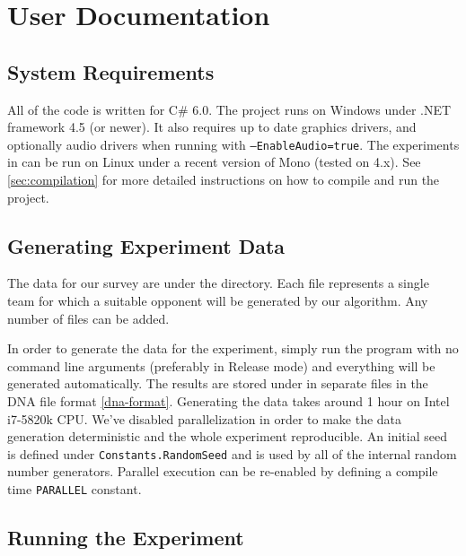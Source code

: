 \chapter{User Documentation}

\section{System Requirements}

All of the code is written for C\# 6.0. The  project runs on Windows under .NET framework 4.5 (or newer). It also requires up to date graphics drivers, and optionally audio drivers when running with \texttt{--EnableAudio=true}. The experiments in  can be run on Linux under a recent version of Mono (tested on 4.x). See \autoref{sec:compilation} for more detailed instructions on how to compile and run the project.

\section{Generating Experiment Data}

The data for our survey are under the  directory. Each file represents a single team for which a suitable opponent will be generated by our algorithm. Any number of files can be added.

In order to generate the data for the experiment, simply run the  program with no command line arguments (preferably in Release mode) and everything will be generated automatically. The results are stored under  in separate files in the DNA file format \autoref{dna-format}. Generating the data takes around 1 hour on Intel i7-5820k CPU. We've disabled parallelization in order to make the data generation deterministic and the whole experiment reproducible. An initial seed is defined under \verb|Constants.RandomSeed| and is used by all of the internal random number generators. Parallel execution can be re-enabled by defining a compile time \verb|PARALLEL| constant.

\section{Running the Experiment}

